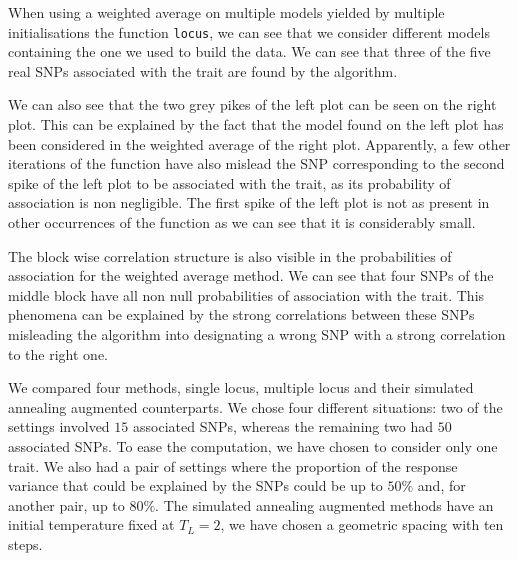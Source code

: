 \documentclass[a4paper, 11pt]{report}
\numberwithin{equation}{chapter}
\begin{document}
When using a weighted average on multiple models yielded by multiple initialisations the function \texttt{locus}, we can see that we consider different models containing the one we used to build the data. We can see that three of the five real SNPs associated with the trait are found by the algorithm.

We can also see that the two grey pikes of the left plot can be seen on the right plot. This can be explained by the fact that the model found on the left plot has been considered in the weighted average of the right plot. Apparently, a few other iterations of the function have also mislead the SNP corresponding to the second spike of the left plot to be associated with the trait, as its probability of association is non negligible. The first spike of the left plot is not as present in other occurrences of the function as we can see that it is considerably small.

The block wise correlation structure is also visible in the probabilities of association for the weighted average method. We can see that four SNPs of the middle block have all non null probabilities of association with the trait. This phenomena can be explained by the strong correlations between these SNPs misleading the algorithm into designating a wrong SNP with a strong correlation to the right one.

We compared four methods, single locus, multiple locus and their simulated annealing augmented counterparts. We chose four different situations: two of the settings involved $15$ associated SNPs, whereas the remaining two had $50$ associated SNPs. To ease the computation, we have chosen to consider only one trait. We also had a pair of settings where the proportion of the response variance that could be explained by the SNPs could be up to $50\%$ and, for another pair, up to $80\%$. The simulated annealing augmented methods have an initial temperature fixed at $T_L = 2$, we have chosen a geometric spacing with ten steps.
\end{document}
